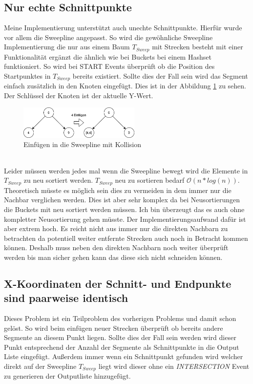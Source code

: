 \documentclass[conference]{IEEEtran}
\begin{document}
	\subsection{Nur echte Schnittpunkte}
	Meine Implementierung unterstützt auch unechte Schnittpunkte. Hierfür wurde vor allem die Sweepline angepasst. So wird die gewöhnliche Sweepline Implementierung die nur aus einem Baum $T_{Sweep}$ mit Strecken besteht mit einer Funktionalität ergänzt die ähnlich wie bei Buckets bei einem Hashset funktioniert. So wird bei START Events überprüft ob die Position des Startpunktes in $T_{Sweep}$ bereits existiert. Sollte dies der Fall sein wird das Segment einfach zusätzlich in den Knoten eingefügt. Dies ist in der Abbildung \ref{figure_collision} zu sehen. Der Schlüssel der Knoten ist der aktuelle Y-Wert.\\
	\begin{figure}[h!]
		\begin{center}
			\includegraphics[width=6cm]{BaumKollision.png}
			\caption{Einfügen in die Sweepline mit Kollision}
			\label{figure_collision}
		\end{center}
	\end{figure}\\
	Leider müssen werden jedes mal wenn die Sweepline bewegt wird die Elemente in $T_{Sweep}$ zu neu sortiert werden. $T_{Sweep}$ neu zu sortieren bedarf $\mathcal{O}(n*log(n))$. Theoretisch müsste es möglich sein dies zu vermeiden in dem immer nur die Nachbar verglichen werden. Dies ist aber sehr komplex da bei Neusortierungen die Buckets mit neu sortiert werden müssen. Ich bin überzeugt das es auch ohne kompletter Neusortierung gehen müsste. Der Implementierungsaufwand dafür ist aber extrem hoch. Es reicht nicht aus immer nur die direkten Nachbarn zu betrachten da potentiell weiter entfernte Strecken auch noch in Betracht kommen können. Deshalb muss neben den direkten Nachbarn noch weiter überprüft werden bis man sicher gehen kann das diese sich nicht schneiden können.
	
	\subsection{X-Koordinaten der Schnitt- und Endpunkte sind paarweise identisch}
	Dieses Problem ist ein Teilproblem des vorherigen Problems und damit schon gelöst.
	So wird beim einfügen neuer Strecken überprüft ob bereits andere Segmente an diesem Punkt liegen. Sollte dies der Fall sein werden wird dieser Punkt entsprechend der Anzahl der Segmente als Schnittpunkte in die Output Liste eingefügt. Außerdem immer wenn ein Schnittpunkt gefunden wird welcher direkt auf der Sweepline $T_{Sweep}$ liegt wird dieser ohne ein \textit{INTERSECTION} Event zu generieren der Outputliste hinzugefügt.
	
\end{document}
